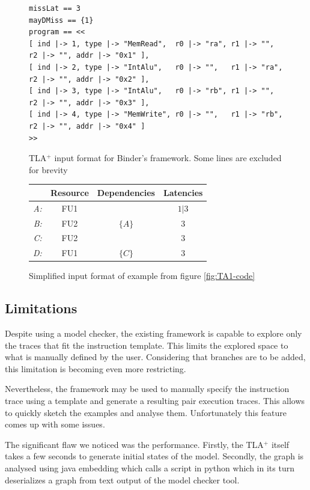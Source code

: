 \begin{figure}[H]
\begin{lstlisting}[basicstyle=\fontsize{8}{13}\selectfont\ttfamily]
missLat == 3
mayDMiss == {1}
program == <<
[ ind |-> 1, type |-> "MemRead",  r0 |-> "ra", r1 |-> "",   r2 |-> "", addr |-> "0x1" ],
[ ind |-> 2, type |-> "IntAlu",   r0 |-> "",   r1 |-> "ra", r2 |-> "", addr |-> "0x2" ],
[ ind |-> 3, type |-> "IntAlu",   r0 |-> "rb", r1 |-> "",   r2 |-> "", addr |-> "0x3" ],
[ ind |-> 4, type |-> "MemWrite", r0 |-> "",   r1 |-> "rb", r2 |-> "", addr |-> "0x4" ]
>>
\end{lstlisting}
\caption{TLA$^+$ input format for Binder's framework. Some lines are excluded for brevity}
\label{fig:TLA-format}
\end{figure}


\begin{figure}[htbp]
	\centering
	\begin{tabular}{r|ccc}
    & Resource & Dependencies & Latencies \\ \hline
    \textit{A:} & FU1 &  & $1 | 3$ \\
    \textit{B:} & FU2 & $\{A\}$ & $3$ \\
    \textit{C:} & FU2 &  & $3$ \\
    \textit{D:} & FU1 & $\{C\}$ & $3$ \\
    \end{tabular}

	\caption{Simplified input format of example from figure \ref{fig:TA1-code}}
	\label{fig:input-format}
\end{figure}

\subsection{Limitations}

Despite using a model checker, the existing framework is capable to explore only the traces that fit the instruction template. This limits the explored space to what is manually defined by the user. Considering that branches are to be added, this limitation is becoming even more restricting. 

Nevertheless, the framework may be used to manually specify the instruction trace using a template and generate a resulting pair execution traces. This allows to quickly sketch the examples and analyse them. Unfortunately this feature comes up with some issues.

The significant flaw we noticed was the performance. Firstly, the TLA$^+$ itself takes a few seconds to generate initial states of the model. Secondly, the graph is analysed using java embedding which calls a script in python which in its turn deserializes a graph from text output of the model checker tool. 

